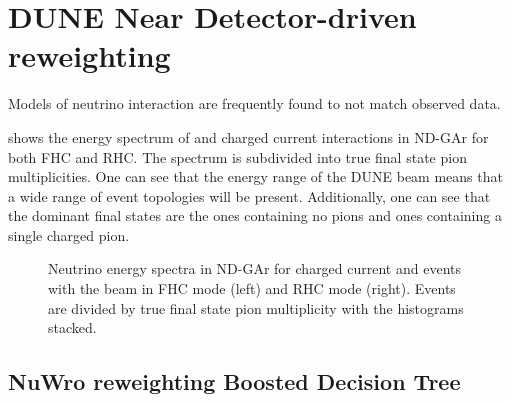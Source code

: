 \chapter{DUNE Near Detector-driven reweighting}
\label{sec:dune_ndrwt}

Models of neutrino interaction are frequently found to not match observed data.



 shows the energy spectrum of \numu and \anumu charged current interactions in ND-GAr for both FHC and RHC.
The spectrum is subdivided into true final state pion multiplicities. 
One can see that the energy range of the DUNE beam means that a wide range of event topologies will be present.
Additionally, one can see that the dominant final states are the ones containing no pions and ones containing a single charged pion.

\begin{figure}[h]
	\begin{minipage}[t]{.5\linewidth}
		\begin{adjustbox}{max totalsize=\linewidth, center}
				
		\end{adjustbox}
	\end{minipage}
	\hfill
	\begin{minipage}[t]{.5\linewidth}
		\begin{adjustbox}{max totalsize=\linewidth, center}
				
		\end{adjustbox}
	\end{minipage}
	\caption[Neutrino energy spectrum in ND-GAr divided by pion multiplicity]{Neutrino energy spectra in ND-GAr for charged current \numu and \anumu events with the beam in FHC mode (left) and RHC mode (right). Events are divided by true final state pion multiplicity with the histograms stacked.}
	\label{fig:energyByMode}
\end{figure}

\section{NuWro reweighting Boosted Decision Tree}
\label{sec:dune_ndrwt:bdt}


